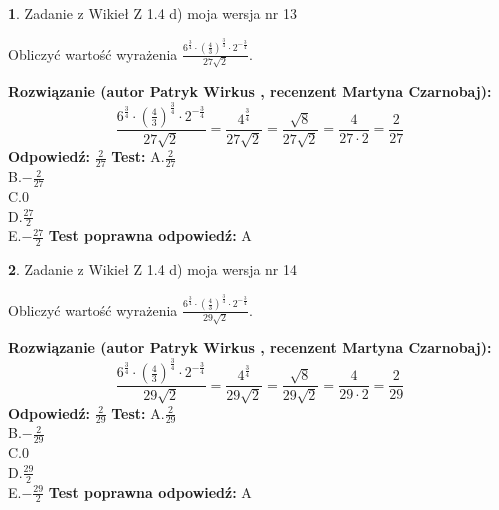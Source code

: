 \documentclass[12pt, a4paper]{article}
\theoremstyle{definition} %
\newtheorem{zad}{}
\newcommand{\zadStart}[1]{\begin{zad}#1\newline}
\newcommand{\zadStop}{\end{zad}}
\newcommand{\rozwStart}[2]{\noindent \textbf{Rozwiązanie (autor #1 , recenzent #2): }\newline}
\newcommand{\rozwStop}{\newline}
\newcommand{\odpStart}{\noindent \textbf{Odpowiedź:}\newline}
\newcommand{\odpStop}{\newline}
\newcommand{\testStart}{\noindent \textbf{Test:}\newline}
\newcommand{\testStop}{\newline}
\newcommand{\kluczStart}{\noindent \textbf{Test poprawna odpowiedź:}\newline}
\newcommand{\kluczStop}{\newline}
\begin{document}
\zadStart{Zadanie z Wikieł Z 1.4 d) moja wersja nr 13}

Obliczyć wartość wyrażenia $\frac{6^{\frac{3}{4}}\cdot (\frac{4}{3})^{\frac{3}{4}}\cdot 2^{-\frac{3}{4}}}{27\sqrt{2}}$.
\zadStop
\rozwStart{Patryk Wirkus}{Martyna Czarnobaj}
$$\frac{6^{\frac{3}{4}}\cdot (\frac{4}{3})^{\frac{3}{4}}\cdot 2^{-\frac{3}{4}}}{27\sqrt{2}} = \frac{4^{\frac{3}{4}}}{27\sqrt{2}} = \frac{\sqrt{8}}{27\sqrt{2}} = \frac{4}{27\cdot 2} = \frac{2}{27}$$
\rozwStop
\odpStart
$\frac{2}{27}$
\odpStop
\testStart
A.$\frac{2}{27}$\\ B.$-\frac{2}{27}$\\ C.$0$\\ D.$\frac{27}{2}$\\ E.$-\frac{27}{2}$
\testStop
\kluczStart
A
\kluczStop



\zadStart{Zadanie z Wikieł Z 1.4 d) moja wersja nr 14}

Obliczyć wartość wyrażenia $\frac{6^{\frac{3}{4}}\cdot (\frac{4}{3})^{\frac{3}{4}}\cdot 2^{-\frac{3}{4}}}{29\sqrt{2}}$.
\zadStop
\rozwStart{Patryk Wirkus}{Martyna Czarnobaj}
$$\frac{6^{\frac{3}{4}}\cdot (\frac{4}{3})^{\frac{3}{4}}\cdot 2^{-\frac{3}{4}}}{29\sqrt{2}} = \frac{4^{\frac{3}{4}}}{29\sqrt{2}} = \frac{\sqrt{8}}{29\sqrt{2}} = \frac{4}{29\cdot 2} = \frac{2}{29}$$
\rozwStop
\odpStart
$\frac{2}{29}$
\odpStop
\testStart
A.$\frac{2}{29}$\\ B.$-\frac{2}{29}$\\ C.$0$\\ D.$\frac{29}{2}$\\ E.$-\frac{29}{2}$
\testStop
\kluczStart
A
\kluczStop
\end{document}
